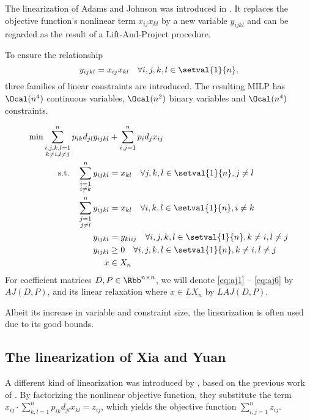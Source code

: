 The linearization of Adams and Johnson was introduced in \cite{MR1290346}. It replaces the objective function's nonlinear term $x_{ij}x_{kl}$ by a new variable $y_{ijkl}$ and can be regarded as the result of a Lift-And-Project procedure. 

To ensure the relationship 
\begin{equation}
	y_{ijkl} = x_{ij}x_{kl}\quad\forall i,j,k,l\in\setval{1}{n},
	\label{eq:yxRelationship}
\end{equation}
three families of linear constraints are introduced. The resulting MILP has $\Ocal(n^4)$ continuous variables, $\Ocal(n^2)$ binary variables and $\Ocal(n^4)$ constraints.

\begin{align}
\allowdisplaybreaks
	\label{eq:aj1}
	\min\sum_{\substack{i,j,k,l = 1\\k\neq i, l\neq j}}^n p_{ik}d_{jl}y_{ijkl} & +\sum_{i,j = 1}^n p_id_jx_{ij}\\
	\label{eq:aj2}
	\text{s.t.}\quad \sum_{\substack{i=1\\i\neq k}}^n y_{ijkl}&=x_{kl}\quad\forall j,k,l \in\setval{1}{n}, j\neq l\\
	\label{eq:aj3}
	\sum_{\substack{j=1\\j\neq l}}^n y_{ijkl}&=x_{kl}\quad\forall i,k,l \in\setval{1}{n}, i\neq k\\
	\label{eq:aj4}
	y_{ijkl}&=y_{klij}\quad\forall i,j,k,l \in\setval{1}{n}, k\neq i, l\neq j\\
	\label{eq:aj5}
	y_{ijkl}&\geq 0\quad\forall i,j,k,l \in\setval{1}{n}, k\neq i, l\neq j\\
	\label{eq:aj6}
	x&\in X_n
\end{align}
For coefficient matrices $D, P\in\Rbb^{n\times n}$, we will denote \eqref{eq:aj1} -- \eqref{eq:aj6} by $AJ(D,P)$, and its linear relaxation where $x\in LX_n$ by $LAJ(D,P)$.

Albeit its increase in variable and constraint size, the linearization is often used due to its good bounds.

\subsection{The linearization of Xia and Yuan}

A different kind of linearization was introduced by \cite{MR2238659}, based on the previous work of \cite{KAUFMAN1978207}. By factorizing the nonlinear objective function, they substitute the term $x_{ij} \cdot \sum_{k,l = 1}^n p_{ik}d_{jl}x_{kl} = z_{ij}$, which yields the objective function $\sum_{i,j=1}^nz_{ij}$. 

